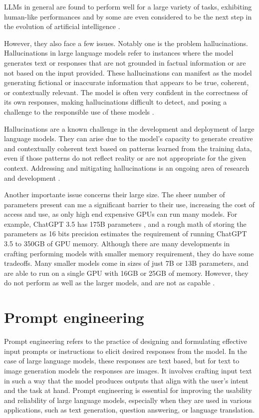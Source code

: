 LLMs in general are found to perform well for a large variety of tasks, exhibiting human-like performances and by some are even considered to be the next step in the evolution of artificial intelligence \cite{bubeck2023sparks}.  

However, they also face a few issues. Notably one is the problem hallucinations. Hallucinations in large language models refer to instances where the model generates text or responses that are not grounded in factual information or are not based on the input provided. These hallucinations can manifest as the model generating fictional or inaccurate information that appears to be true, coherent, or contextually relevant. The model is often very confident in the correctness of its own responses, making hallucinations difficult to detect, and posing a challenge to the responsible use of these models \cite{alkaissi2023artificial,azamfirei2023large}.

Hallucinations are a known challenge in the development and deployment of large language models. They can arise due to the model's capacity to generate creative and contextually coherent text based on patterns learned from the training data, even if those patterns do not reflect reality or are not appropriate for the given context. Addressing and mitigating hallucinations is an ongoing area of research and development \cite{gunjal2023detecting,mundler2023self,peng2023check}.

Another importante issue concerns their large size. The sheer number of parameters present can me a significant barrier to their use, increasing the cost of access and use, as only high end expensive GPUs can run many models. For example, ChatGPT 3.5 has 175B parameters \cite{chatgpt-parameters}, and a rough math of storing the parameters as 16 bits precision estimates the requirement of running ChatGPT 3.5 to 350GB of GPU memory. Although there are many developments in crafting performing models with smaller memory requirement, they do have some tradeoffs. Many smaller models come in sizes of just 7B or 13B parameters, and are able to run on a single GPU with 16GB or 25GB of memory. However, they do not perform as well as the larger models, and are not as capable \cite{touvronllama,falcon40b,mpt7b,wizard-vicuna}. 

\section{Prompt engineering}

Prompt engineering refers to the practice of designing and formulating effective input prompts or instructions to elicit desired responses from the model. In the case of large language models, these responses are text based, but for text to image generation models the responses are images. It involves crafting input text in such a way that the model produces outputs that align with the user's intent and the task at hand. Prompt engineering is essential for improving the usability and reliability of large language models, especially when they are used in various applications, such as text generation, question answering, or language translation. \cite{white2023prompt,zhou2022learning,oppenlaender2022prompt,reynolds2021prompt}

